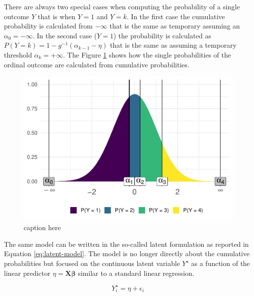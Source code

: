 \documentclass[
  man,floatsintext]{apa6}
\begin{document}
There are always two special cases when computing the probability of a single outcome \(Y\) that is when \(Y = 1\) and \(Y = k\). In the first case the cumulative probability is calculated from \(-\infty\) that is the same as temporary assuming an \(\alpha_0 = -\infty\). In the second case (\(Y = 1\)) the probability is calculated as \(P(Y = k) = 1 - g^{-1}(\alpha_{k - 1} - \eta)\) that is the same as assuming a temporary threshold \(\alpha_k = +\infty\). The Figure \ref{fig:fig-explain-cumulative} shows how the single probabilities of the ordinal outcome are calculated from cumulative probabilities.

\scriptsize

\begin{figure}

{\centering \includegraphics{paper-new_files/figure-latex/fig-explain-cumulative-1} 

}

\caption{caption here}\label{fig:fig-explain-cumulative}
\end{figure}

\normalsize

The same model can be written in the so-called latent formulation as reported in Equation \eqref{eq:latent-model}. The model is no longer directly about the cumulative probabilities but focused on the continuous latent variable \(Y^\star\) as a function of the linear predictor \(\eta = \mathbf{X} \boldsymbol{\beta}\) similar to a standard linear regression.

\begin{equation} 
Y^\star_i = \eta + \epsilon_i
\label{eq:latent-model}
\end{equation}
\end{document}
